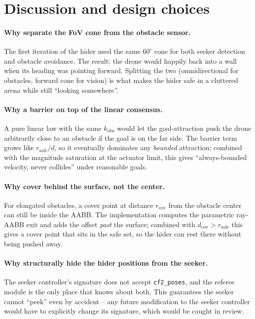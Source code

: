 \documentclass[11pt,a4paper]{article}
\newcommand{\code}[1]{\texttt{#1}}
\begin{document}
\section{Discussion and design choices}

\paragraph{Why separate the FoV cone from the obstacle sensor.}
The first iteration of the hider used the same $60^\circ$ cone for both
seeker detection and obstacle avoidance. The result: the drone would happily
back into a wall when its heading was pointing forward. Splitting the two
(omnidirectional for obstacles, forward cone for vision) is what makes the
hider safe in a cluttered arena while still ``looking somewhere''.

\paragraph{Why a barrier on top of the linear consensus.}
A pure linear law with the same $k_\mathrm{obs}$ would let the goal-attraction
push the drone arbitrarily close to an obstacle if the goal is on the far
side. The barrier term grows like $r_\mathrm{safe}/d$, so it eventually
dominates any \emph{bounded} attraction; combined with the magnitude
saturation at the actuator limit, this gives ``always-bounded velocity, never
collides'' under reasonable goals.

\paragraph{Why cover behind the surface, not the center.}
For elongated obstacles, a cover point at distance $r_\mathrm{cov}$ from the
obstacle center can still be inside the AABB. The implementation computes the
parametric ray-AABB exit and adds the offset \emph{past} the surface; combined
with $d_\mathrm{cov} > r_\mathrm{safe}$ this gives a cover point that sits in
the safe set, so the hider can rest there without being pushed away.

\paragraph{Why structurally hide the hider positions from the seeker.}
The seeker controller's signature does not accept \code{cf2\_poses}, and the
referee module is the only place that knows about both. This guarantees the
seeker cannot ``peek'' even by accident -- any future modification to the
seeker controller would have to explicitly change its signature, which would
be caught in review.
\end{document}

